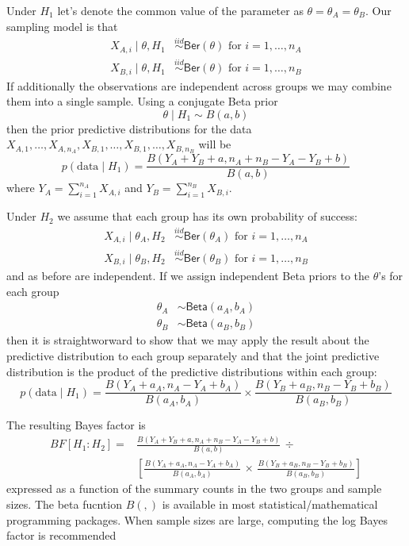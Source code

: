 \documentclass[11pt]{article}
\def\Ber{\textsf{Ber}}
\def\iid{\stackrel{iid}{\sim}}
\newcommand{\Beta}{\textsf{Beta}}
\def\BF{\textit{BF}}
\def\data{\text{data}}
\begin{document}
Under $H_1$ let's denote the common value of the parameter as $\theta = \theta_A = \theta_B$.  Our sampling model is that 
 \begin{align*}
X_{A,i} \mid \theta, H_1 & \iid \Ber(\theta) \text{ for }i = 1, \ldots, n_A \\
X_{B,i} \mid \theta, H_1 & \iid \Ber(\theta)  \text{ for } i = 1, \ldots, n_B  
\end{align*}
If additionally the observations are independent across groups we may combine them into a single sample. Using a conjugate Beta prior 
$$\theta \mid H_1 \sim B(a, b)$$
then the prior predictive distributions for the data $X_{A,1}, \ldots, X_{A, n_A}, X_{B,1}, \ldots, X_{B, 1}, \ldots, X_{B, n_B}$ will be
$$p(\data \mid H_1) = \frac{B(Y_A + Y_B + a, n_A + n_B - Y_A - Y_B + b)}{B(a,b)}
$$
where $Y_A = \sum_{i = 1}^{n_A} X_{A,i}$ and $Y_B = \sum_{i = 1}^{n_B}X_{B, i}$.

Under $H_2$ we assume that each group has its own probability of success:
\begin{align*}
X_{A,i}  \mid \theta_A, H_2 & \iid \Ber(\theta_A) \text{ for }i = 1, \ldots, n_A \\
X_{B,i}  \mid \theta_B, H_2 & \iid \Ber(\theta_B)  \text{ for } i = 1, \ldots, n_B  
\end{align*}
and as before are independent.  If we assign independent Beta priors to the $\theta$'s  for each group
\begin{align*}
\theta_A & \sim \Beta(a_A, b_A) \\
\theta_B & \sim \Beta(a_B, b_B)
\end{align*}
then it is straightworward to show that we may apply the result about the predictive distribution to each group separately and that the joint predictive distribution is the product of the predictive distributions within each group:
$$p(\data \mid H_1) = \frac{B(Y_A + a_A, n_A - Y_A  + b_A)} {B(a_A,b_A)}\times 
\frac{B(Y_B + a_B, n_B - Y_B  + b_B)} {B(a_B,b_B)}
$$


The resulting Bayes factor is 
\begin{align*}
\BF[H_1: H_2] =  & \frac{B(Y_A + Y_B + a, n_A + n_B - Y_A - Y_B + b)}{B(a,b)} \, \div \\ & \left[ \frac{B(Y_A + a_A, n_A - Y_A  + b_A)}{B(a_A,b_A)} \, \times \,
\frac{B(Y_B + a_B, n_B - Y_B  + b_B)} {B(a_B,b_B)} \right]
\end{align*}
expressed as a function of the summary counts in the two groups and sample sizes.  The beta fucntion  $B(,)$ is available in most statistical/mathematical programming packages.   When sample sizes are large, computing the log Bayes factor is recommended
\end{document}
